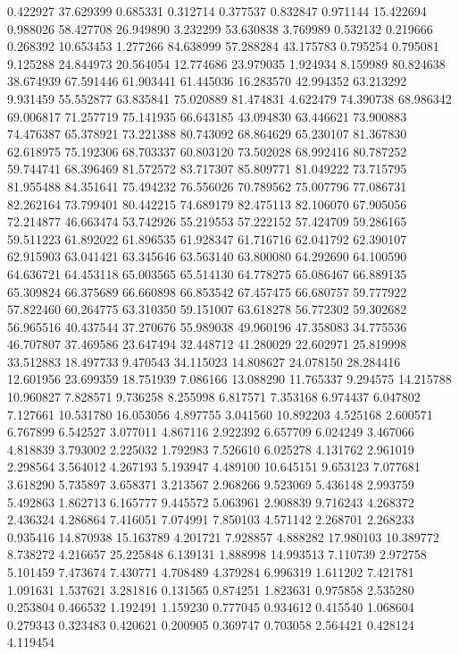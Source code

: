 0.422927
37.629399
0.685331
0.312714
0.377537
0.832847
0.971144
15.422694
0.988026
58.427708
26.949890
3.232299
53.630838
3.769989
0.532132
0.219666
0.268392
10.653453
1.277266
84.638999
57.288284
43.175783
0.795254
0.795081
9.125288
24.844973
20.564054
12.774686
23.979035
1.924934
8.159989
80.824638
38.674939
67.591446
61.903441
61.445036
16.283570
42.994352
63.213292
9.931459
55.552877
63.835841
75.020889
81.474831
4.622479
74.390738
68.986342
69.006817
71.257719
75.141935
66.643185
43.094830
63.446621
73.900883
74.476387
65.378921
73.221388
80.743092
68.864629
65.230107
81.367830
62.618975
75.192306
68.703337
60.803120
73.502028
68.992416
80.787252
59.744741
68.396469
81.572572
83.717307
85.809771
81.049222
73.715795
81.955488
84.351641
75.494232
76.556026
70.789562
75.007796
77.086731
82.262164
73.799401
80.442215
74.689179
82.475113
82.106070
67.905056
72.214877
46.663474
53.742926
55.219553
57.222152
57.424709
59.286165
59.511223
61.892022
61.896535
61.928347
61.716716
62.041792
62.390107
62.915903
63.041421
63.345646
63.563140
63.800080
64.292690
64.100590
64.636721
64.453118
65.003565
65.514130
64.778275
65.086467
66.889135
65.309824
66.375689
66.660898
66.853542
67.457475
66.680757
59.777922
57.822460
60.264775
63.310350
59.151007
63.618278
56.772302
59.302682
56.965516
40.437544
37.270676
55.989038
49.960196
47.358083
34.775536
46.707807
37.469586
23.647494
32.448712
41.280029
22.602971
25.819998
33.512883
18.497733
9.470543
34.115023
14.808627
24.078150
28.284416
12.601956
23.699359
18.751939
7.086166
13.088290
11.765337
9.294575
14.215788
10.960827
7.828571
9.736258
8.255998
6.817571
7.353168
6.974437
6.047802
7.127661
10.531780
16.053056
4.897755
3.041560
10.892203
4.525168
2.600571
6.767899
6.542527
3.077011
4.867116
2.922392
6.657709
6.024249
3.467066
4.818839
3.793002
2.225032
1.792983
7.526610
6.025278
4.131762
2.961019
2.298564
3.564012
4.267193
5.193947
4.489100
10.645151
9.653123
7.077681
3.618290
5.735897
3.658371
3.213567
2.968266
9.523069
5.436148
2.993759
5.492863
1.862713
6.165777
9.445572
5.063961
2.908839
9.716243
4.268372
2.436324
4.286864
7.416051
7.074991
7.850103
4.571142
2.268701
2.268233
0.935416
14.870938
15.163789
4.201721
7.928857
4.888282
17.980103
10.389772
8.738272
4.216657
25.225848
6.139131
1.888998
14.993513
7.110739
2.972758
5.101459
7.473674
7.430771
4.708489
4.379284
6.996319
1.611202
7.421781
1.091631
1.537621
3.281816
0.131565
0.874251
1.823631
0.975858
2.535280
0.253804
0.466532
1.192491
1.159230
0.777045
0.934612
0.415540
1.068604
0.279343
0.323483
0.420621
0.200905
0.369747
0.703058
2.564421
0.428124
4.119454
